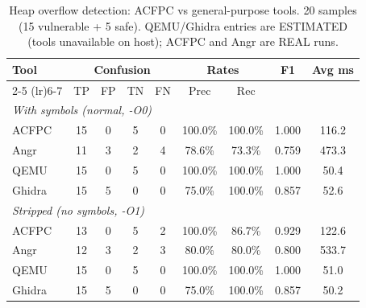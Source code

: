 \begin{table}[t]
\centering
\caption{Heap overflow detection: ACFPC vs general-purpose tools. 20 samples (15 vulnerable + 5 safe). QEMU/Ghidra entries are ESTIMATED (tools unavailable on host); ACFPC and Angr are REAL runs.}
\label{tab:acfpc}
\begin{tabular}{lcccccccc}
\toprule
\multirow{2}{*}{Tool} & \multicolumn{4}{c}{Confusion} & \multicolumn{2}{c}{Rates} & \multirow{2}{*}{F1} & \multirow{2}{*}{Avg ms} \\
\cmidrule(lr){2-5} \cmidrule(lr){6-7}
 & TP & FP & TN & FN & Prec & Rec & & \\
\midrule
\multicolumn{9}{l}{\emph{With symbols (normal, -O0)}} \\
ACFPC & 15 & 0 & 5 & 0 & 100.0\% & 100.0\% & 1.000 & 116.2 \\
Angr & 11 & 3 & 2 & 4 & 78.6\% & 73.3\% & 0.759 & 473.3 \\
QEMU & 15 & 0 & 5 & 0 & 100.0\% & 100.0\% & 1.000 & 50.4 \\
Ghidra & 15 & 5 & 0 & 0 & 75.0\% & 100.0\% & 0.857 & 52.6 \\
\midrule
\multicolumn{9}{l}{\emph{Stripped (no symbols, -O1)}} \\
ACFPC & 13 & 0 & 5 & 2 & 100.0\% & 86.7\% & 0.929 & 122.6 \\
Angr & 12 & 3 & 2 & 3 & 80.0\% & 80.0\% & 0.800 & 533.7 \\
QEMU & 15 & 0 & 5 & 0 & 100.0\% & 100.0\% & 1.000 & 51.0 \\
Ghidra & 15 & 5 & 0 & 0 & 75.0\% & 100.0\% & 0.857 & 50.2 \\
\bottomrule
\end{tabular}
\end{table}
